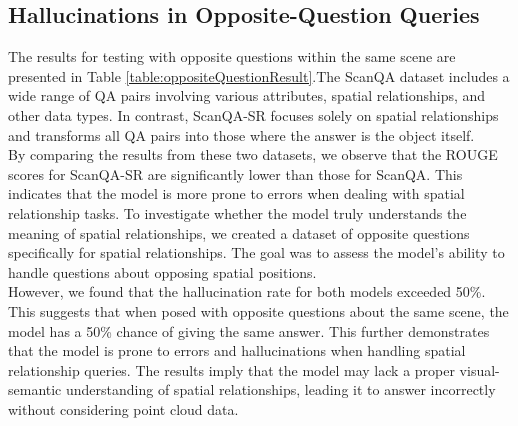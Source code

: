 \subsection{Hallucinations in Opposite-Question Queries}The results for testing with 
opposite questions within the same scene are presented in Table \ref{table:oppositeQuestionResult}.The ScanQA dataset includes a wide range of QA pairs involving various attributes, spatial relationships, and other data types. In contrast, ScanQA-SR focuses solely on spatial relationships and transforms all QA pairs into those where the answer is the object itself.\\
By comparing the results from these two datasets, we observe that the ROUGE scores for ScanQA-SR are significantly lower than those for ScanQA. This indicates that the model is more prone to errors when dealing with spatial relationship tasks. To investigate whether the model truly understands the meaning of spatial relationships, we created a dataset of opposite questions specifically for spatial relationships. The goal was to assess the model’s ability to handle questions about opposing spatial positions.\\
However, we found that the hallucination rate for both models exceeded 50\%. This suggests that when posed with opposite questions about the same scene, the model has a 50\% chance of giving the same answer. This further demonstrates that the model is prone to errors and hallucinations when handling spatial relationship queries. The results imply that the model may lack a proper visual-semantic understanding of spatial relationships, leading it to answer incorrectly without considering point cloud data.





